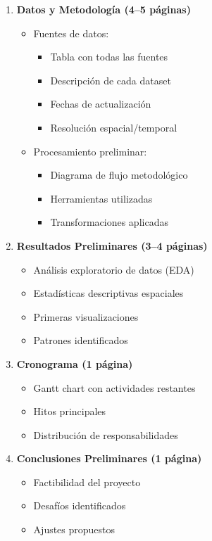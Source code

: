 \documentclass[11pt,a4paper]{article}
\begin{document}
\begin{enumerate}[leftmargin=1.2cm]
  \item \textbf{Datos y Metodología (4--5 páginas)}
  \begin{itemize}[leftmargin=1.2cm]
    \item Fuentes de datos:
    \begin{itemize}[leftmargin=1.2cm]
      \item Tabla con todas las fuentes
      \item Descripción de cada dataset
      \item Fechas de actualización
      \item Resolución espacial/temporal
    \end{itemize}
    \item Procesamiento preliminar:
    \begin{itemize}[leftmargin=1.2cm]
      \item Diagrama de flujo metodológico
      \item Herramientas utilizadas
      \item Transformaciones aplicadas
    \end{itemize}
  \end{itemize}

  \item \textbf{Resultados Preliminares (3--4 páginas)}
  \begin{itemize}[leftmargin=1.2cm]
    \item Análisis exploratorio de datos (EDA)
    \item Estadísticas descriptivas espaciales
    \item Primeras visualizaciones
    \item Patrones identificados
  \end{itemize}

  \item \textbf{Cronograma (1 página)}
  \begin{itemize}[leftmargin=1.2cm]
    \item Gantt chart con actividades restantes
    \item Hitos principales
    \item Distribución de responsabilidades
  \end{itemize}

  \item \textbf{Conclusiones Preliminares (1 página)}
  \begin{itemize}[leftmargin=1.2cm]
    \item Factibilidad del proyecto
    \item Desafíos identificados
    \item Ajustes propuestos
  \end{itemize}
\end{enumerate}
\end{document}
